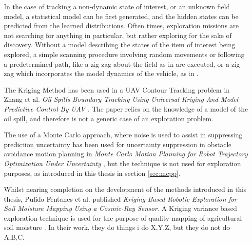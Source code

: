 In the case of tracking a non-dynamic state of interest, or an unknown field model, a statistical model can be first generated, and the hidden states can be predicted from the learned distributions. Often times, exploration missions are not searching for anything in particular, but rather exploring for the sake of discovery. Without a model describing the states of the item of interest being explored, a simple scanning procedure involving random movements or following a predetermined path, like a zig-zag about the field as in \cite{semsch:uav_zig} are executed, or a zig-zag which incorporates the model dynamics of the vehicle, as in \cite{nigam:zigzag}.

The Kriging Method has been used in a UAV Contour Tracking problem in Zhang et al. \textit{Oil Spills Boundary Tracking Using Universal Kriging And Model Predictive Control By UAV} \cite{zhang:oil_krig}. The paper relies on the knowledge of a model of the oil spill, and therefore is not a generic case of an exploration problem.

The use of a Monte Carlo approach, where noise is used to assist in suppressing prediction uncertainty has been used for uncertainty suppression in obstacle avoidance motion planning in \textit{Monte Carlo Motion Planning for Robot Trajectory Optimization Under Uncertainty} \cite{janson:mcmp}, but the technique is not used for exploration purposes, as introduced in this thesis in section \ref{sec:mcpp}.

Whilst nearing completion on the development of the methods introduced in this thesis, Pulido Fentanes et al. published \textit{Kriging-Based Robotic Exploration for Soil Moisture Mapping Using a Cosmic-Ray Sensor}. A Kriging variance based exploration technique is used for the purpose of quality mapping of agricultural soil moisture \cite{fentanes:soilkrig}. In their work, they do things i do X,Y,Z, but they do not do A,B,C.

